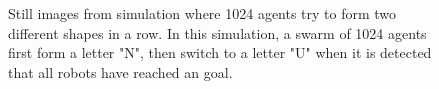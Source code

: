 \documentclass[journal]{IEEEtran}
\begin{document}
\begin{figure}[t]
\hfill
{}\hfill

\caption{Still images from simulation where 1024 agents try to form two different shapes in a row. In this simulation, a swarm of 1024 agents first form a letter "N", then switch to a letter "U" when it is detected that all robots have reached an goal.}
\label{fig:sim}
\end{figure}
\end{document}
